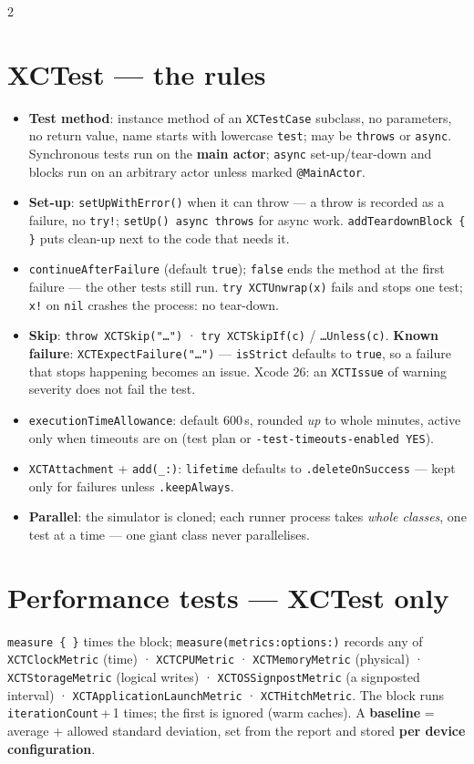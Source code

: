 \documentclass[8pt]{extarticle}
\newcommand\ct[1]{\texttt{#1}}
\begin{document}
\begin{multicols}{2}
\raggedright
\footnotesize{}

\section{XCTest — the rules}
\begin{itemize}
  \item \textbf{Test method}: instance method of an \ct{XCTestCase} subclass, no parameters, no
        return value, name starts with lowercase \ct{test}; may be \ct{throws} or \ct{async}.
        Synchronous tests run on the \textbf{main actor}; \ct{async} set-up/tear-down and
        blocks run on an arbitrary actor unless marked \ct{@MainActor}.
  \item \textbf{Set-up}: \ct{setUpWithError()} when it can throw — a throw is recorded as a
        failure, no \ct{try!}; \ct{setUp() async throws} for async work.
        \ct{addTeardownBlock \{ \}} puts clean-up next to the code that needs it.
  \item \ct{continueAfterFailure} (default \ct{true}); \ct{false} ends the method at the first
        failure — the other tests still run. \ct{try XCTUnwrap(x)} fails and stops one test;
        \ct{x!} on \ct{nil} crashes the process: no tear-down.
  \item \textbf{Skip}: \ct{throw XCTSkip("…")} · \ct{try XCTSkipIf(c)} / \ct{…Unless(c)}.
        \textbf{Known failure}: \ct{XCTExpectFailure("…")} — \ct{isStrict} defaults to
        \ct{true}, so a failure that stops happening becomes an issue. Xcode 26: an
        \ct{XCTIssue} of warning severity does not fail the test.
  \item \ct{executionTimeAllowance}: default 600\,s, rounded \emph{up} to whole minutes, active
        only when timeouts are on (test plan or \ct{-test-timeouts-enabled YES}).
  \item \ct{XCTAttachment} + \ct{add(\_:)}: \ct{lifetime} defaults to \ct{.deleteOnSuccess} —
        kept only for failures unless \ct{.keepAlways}.
  \item \textbf{Parallel}: the simulator is cloned; each runner process takes \emph{whole
        classes}, one test at a time — one giant class never parallelises.
\end{itemize}

\section{Performance tests — XCTest only}
\ct{measure \{ \}} times the block; \ct{measure(metrics:options:)} records any of
\ct{XCTClockMetric} (time) · \ct{XCTCPUMetric} · \ct{XCTMemoryMetric} (physical) ·
\ct{XCTStorageMetric} (logical writes) · \ct{XCTOSSignpostMetric} (a signposted interval) ·
\ct{XCTApplicationLaunchMetric} · \ct{XCTHitchMetric}. The block runs
\ct{iterationCount}\,+\,1 times; the first is ignored (warm caches). A \textbf{baseline} =
average + allowed standard deviation, set from the report and stored \textbf{per device
configuration}.


\end{multicols}
\end{document}
